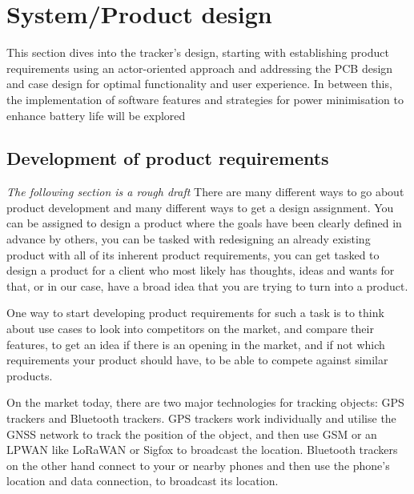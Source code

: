 \section{System/Product design} \label{sec:design}
This section dives into the tracker's design, starting with establishing product requirements using an actor-oriented approach and addressing the \ac{PCB} design and case design for optimal functionality and user experience.
In between this, the implementation of software features and strategies for power minimisation to enhance battery life will be explored

\subsection{Development of product requirements}
\textit{The following section is a rough draft}
There are many different ways to go about product development and many different ways to get a design assignment. You can be assigned to design a product where the goals have been clearly defined in advance by others, you can be tasked with redesigning an already existing product with all of its inherent product requirements, you can get tasked to design a product for a client who most likely has thoughts, ideas and wants for that, or in our case, have a broad idea that you are trying to turn into a product.

One way to start developing product requirements for such a task is to think about use cases to look into competitors on the market, and compare their features, to get an idea if there is an opening in the market, and if not which requirements your product should have, to be able to compete against similar products.

On the market today, there are two major technologies for tracking objects: \ac{GPS} trackers and Bluetooth trackers.
\ac{GPS} trackers work individually and utilise the \ac{GNSS} network to track the position of the object, and then use \ac{GSM} or an \ac{LPWAN} like \ac{LoRaWAN} or Sigfox to broadcast the location.
Bluetooth trackers on the other hand connect to your or nearby phones and then use the phone's location and data connection, to broadcast its location.



